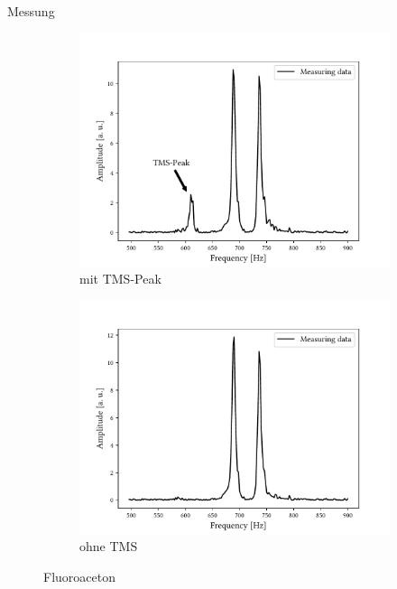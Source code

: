\begin{frame}{Messung}
\begin{figure}
	\centering
	\begin{subfigure}{.49\textwidth}
	\centering
	\includegraphics[scale=.36]{..//figures//f61_abb_7.pdf}
	\caption{mit TMS-Peak}
	\end{subfigure}
	\begin{subfigure}{.49\textwidth}
	\centering
	\includegraphics[scale=.36]{..//figures//f61_abb_7_ohne.pdf}
	\caption{ohne TMS}
	\end{subfigure}	
	\caption{Fluoroaceton}
	\end{figure}
\end{frame}


